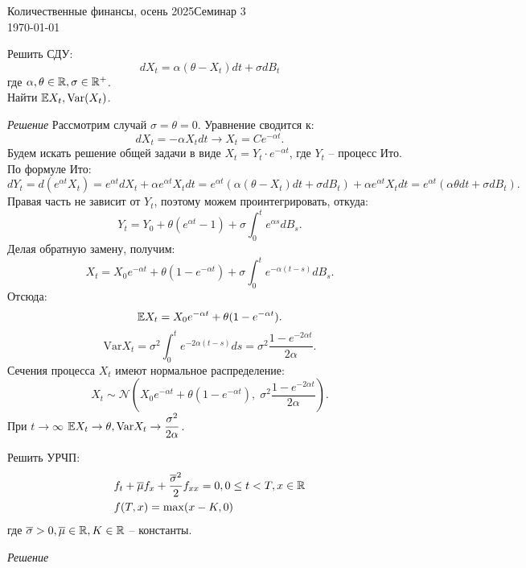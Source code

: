 \documentclass[12pt]{article}
\begin{document}
\noindent Количественные финансы, осень 2025\hfill Семинар 3\\
\today

\hrulefill
\begin{problem}
    Решить СДУ:
    $$
        dX_t = \alpha (\theta -  X_t) dt + \sigma dB_t
    $$
    где $\alpha, \theta \in \mathbb{R}, \sigma \in \mathbb{R}^+$. \\
    Найти $\mathbb{E} X_t, \mathrm{Var}(X_t)$. 
\end{problem}
\textit{Решение}
Рассмотрим случай $\sigma = \theta = 0$. Уравнение сводится к:
$$
    dX_t = -\alpha X_t dt \to X_t = C e^{-\alpha t}.
$$
Будем искать решение общей задачи в виде $X_t = Y_t \cdot e^{-\alpha t}$, где $Y_t$ -- процесс Ито. По формуле Ито:
$$
    dY_t = d(e^{\alpha t}X_t) = e^{\alpha t} dX_t + \alpha e^{\alpha t} X_t dt 
    = e^{\alpha t} \left( \alpha (\theta - X_t) dt + \sigma dB_t \right) + \alpha e^{\alpha t} X_t dt
    = e^{\alpha t} \left( \alpha \theta dt + \sigma dB_t \right).
$$
Правая часть не зависит от $Y_t$, поэтому можем проинтегрировать, откуда:
$$
    Y_t = Y_0 + \theta (e^{\alpha t} - 1) + \sigma \int_0^t e^{\alpha s} dB_s.
$$ Делая обратную замену, получим:
$$
    X_t = X_0 e^{-\alpha t} + \theta (1 - e^{-\alpha t}) + \sigma \int_0^t e^{-\alpha (t-s)} dB_s.
$$
Отсюда:
$$
    \mathbb{E} X_t = X_0 e^{-\alpha t} + \theta (1 - e^{-\alpha t}).
$$
$$
    \mathrm{Var} X_t = \sigma^2 \int_0^t e^{-2\alpha (t-s)} ds = \sigma^2 \dfrac{1-e^{-2\alpha t}}{2\alpha}.
$$
Сечения процесса $X_t$ имеют нормальное распределение:
$$X_t \sim \mathcal{N}\left(X_0 e^{-\alpha t} + \theta (1 - e^{-\alpha t}), \; \sigma^2 \dfrac{1-e^{-2\alpha t}}{2\alpha}\right).$$
При $t \to \infty$ $\mathbb{E} X_t \to \theta, \mathrm{Var} X_t \to \dfrac{\sigma^2}{2\alpha}$. 

\begin{problem}
    Решить УРЧП:
    \begin{align*}
        &f_t + \overline{\mu} f_x + \dfrac{\overline{\sigma}^2}{2} f_{xx} = 0, 0 \leq t < T, x \in \mathbb{R} \\
        &f(T, x) = \max(x - K, 0)
    \end{align*}
    где $\overline{\sigma} > 0, \overline{\mu} \in \mathbb{R}, K \in \mathbb{R}$ -- константы.
\end{problem}
\textit{Решение}
\end{document}
